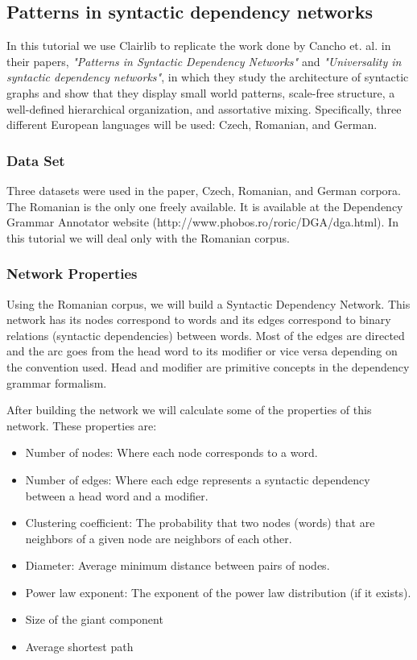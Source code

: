 \subsection{Patterns in syntactic dependency networks}

In this tutorial we use Clairlib to replicate the work done by Cancho et. al. in their papers, \emph{"Patterns in Syntactic Dependency Networks"} and \emph{"Universality in syntactic dependency networks"}, in which they study the architecture of syntactic graphs and show that they display small world patterns, scale-free structure, a well-defined hierarchical organization, and assortative mixing. Specifically, three different European languages will be used: Czech, Romanian, and German.

\subsubsection{Data Set}

Three datasets were used in the paper, Czech, Romanian, and German corpora. The Romanian is the only one freely available. It is available at the Dependency Grammar Annotator website (http://www.phobos.ro/roric/DGA/dga.html). In this tutorial we will deal only with the Romanian corpus.

\subsubsection{Network Properties}

Using the Romanian corpus, we will build a Syntactic Dependency Network. This network has its nodes correspond to words and its edges correspond to binary relations (syntactic dependencies) between words. Most of the edges are directed and the arc goes from the head word to its modifier or vice versa depending on the convention used. Head and modifier are primitive concepts in the dependency grammar formalism.

After building the network we will calculate some of the properties of this network. These properties are:
\begin{itemize}
  \item Number of nodes: Where each node corresponds to a word.
  \item Number of edges: Where each edge represents a syntactic dependency between a head word and a modifier.
  \item Clustering coefficient: The probability that two nodes (words) that are neighbors of a given node are neighbors of each other.
  \item Diameter: Average minimum distance between pairs of nodes.
  \item Power law exponent: The exponent of the power law distribution (if it exists).
  \item Size of the giant component
  \item Average shortest path
\end{itemize}

